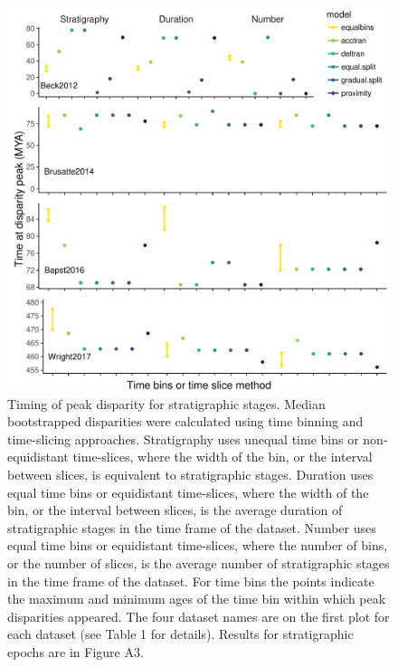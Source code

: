 \documentclass[12pt,a4paper]{article}
\begin{document}
\begin{figure}[!htbp]
    \centering
    \includegraphics[width=1\linewidth, height=1\textheight, keepaspectratio]{figures/fig-peaks-age-appendix-revision.pdf}
    \caption[Timing of peak disparity for four example datasets.]
    {Timing of peak disparity for stratigraphic stages.
    Median bootstrapped disparities were calculated using time binning and time-slicing approaches. 
    Stratigraphy uses unequal time bins or non-equidistant time-slices, where the width of the bin, or the interval between slices, is equivalent to stratigraphic stages. 
    Duration uses equal time bins or equidistant time-slices, where the width of the bin, or the interval between slices, is the average duration of stratigraphic stages in the time frame of the dataset. 
    Number uses equal time bins or equidistant time-slices, where the number of bins, or the number of slices, is the average number of stratigraphic stages in the time frame of the dataset. 
    For time bins the points indicate the maximum and minimum ages of the time bin within which peak disparities appeared.
    The four dataset names are on the first plot for each dataset (see Table 1 for details).
    Results for stratigraphic epochs are in Figure A3.}
    \label{figure:peak3}
  \end{figure}
\end{document}
